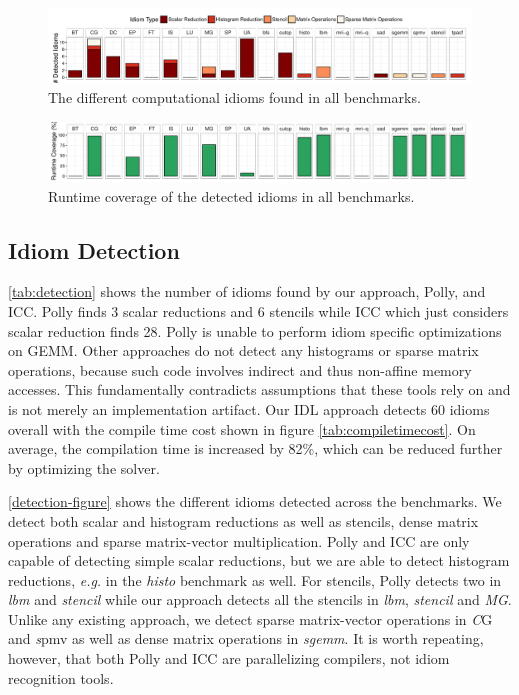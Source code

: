 \begin{figure}[t]
  \centering
  \includegraphics[width=\textwidth]{figures/asplosplots/detection.pdf}
  \caption{The different computational idioms found in all benchmarks.}
  \label{detection-figure}
\end{figure}
\begin{figure}[t]
  \centering
  \includegraphics[width=\textwidth]{figures/asplosplots/coverage.pdf}
  \caption{Runtime coverage of the detected idioms in all benchmarks.}
  \label{coverage-figure}
  \vspace{0.5em}
\end{figure}

\subsection{Idiom Detection}

    \autoref{tab:detection} shows the number of idioms found by our approach, Polly, and ICC.
    Polly finds 3 scalar reductions and 6 stencils while ICC which just considers  scalar reduction finds 28.
    Polly is unable to perform idiom specific optimizations on GEMM.
    Other approaches do not detect any histograms or sparse matrix operations, because such code involves indirect and thus non-affine memory accesses.
    This fundamentally contradicts assumptions that these tools rely on and is not merely an implementation artifact.
    Our IDL approach detects 60 idioms overall with the compile time cost shown in figure \autoref{tab:compiletimecost}.
    On average, the compilation time is increased by 82\%, which can be reduced further by optimizing the solver.

    \autoref{detection-figure} shows the different idioms detected across
    the  benchmarks. We detect both scalar
    and histogram reductions as well as stencils, dense matrix operations
    and sparse matrix-vector multiplication.
    Polly and ICC are only capable of detecting simple scalar
    reductions, but we are able to detect histogram reductions, {\em e.g.} in
    the \emph{histo} benchmark as well.  For stencils, Polly detects two
    in \emph{lbm} and \emph{stencil} while our approach
    detects all the stencils in \emph{lbm}, \emph{stencil} and \emph{MG}.
    Unlike any existing approach, we detect sparse matrix-vector
    operations in {\emph CG} and {\emph spmv} as well as dense matrix
    operations in \emph{sgemm}. It is worth repeating, however, that both
    Polly and ICC are parallelizing compilers, not idiom recognition
    tools.

